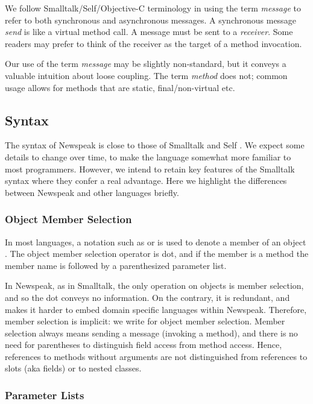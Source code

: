 \documentclass{article}
\begin{document}
We follow Smalltalk/Self/Objective-C terminology in using the term {\em message} to refer to both synchronous and asynchronous messages. A synchronous message {\em send} is like a virtual method call.
A message must be sent to a {\em receiver}. Some readers may prefer to think of the receiver as the target of a method invocation.  

Our use of the term {\em message} may be slightly non-standard, but it conveys a valuable intuition about loose coupling. The term {\em method} does not; common usage allows for methods that are static, final/non-virtual etc.

\subsection{Syntax}

The syntax of Newspeak is close to those of Smalltalk and Self \cite{UngarSmith87}. We expect some details to change over time, to make the language somewhat more familiar to most programmers. However, we intend to retain key features of the Smalltalk syntax where they confer a real advantage. Here we highlight the differences between Newspeak and other languages briefly.

\subsubsection{Object Member Selection}

In most languages, a notation such as   or  is used to denote a member  of an object . The object member selection operator is dot, and if the member is a method the member name is followed by a parenthesized parameter list. 

In Newspeak, as in Smalltalk, the only operation on objects is member selection, and so the dot conveys no information. On the contrary, it is redundant, and makes it harder to embed domain specific languages within Newspeak. Therefore, member selection is implicit: we write  for object member selection. Member selection always means sending
a message (invoking a method), and there is no need for parentheses to distinguish field access from
method access. Hence, references to methods without arguments are not distinguished from references to slots (aka fields) or to nested classes.

\subsubsection{Parameter Lists}
\end{document}
